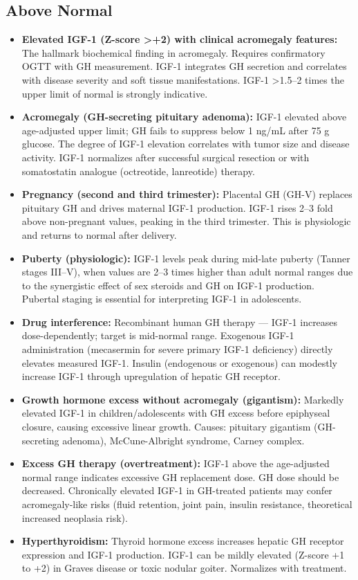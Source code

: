 \subsection*{Above Normal}
\begin{itemize}
  \item \textbf{Elevated IGF-1 (Z-score >+2) with clinical acromegaly features:} The hallmark biochemical finding in acromegaly. Requires confirmatory OGTT with GH measurement. IGF-1 integrates GH secretion and correlates with disease severity and soft tissue manifestations. IGF-1 >1.5--2 times the upper limit of normal is strongly indicative.
  \item \textbf{Acromegaly (GH-secreting pituitary adenoma):} IGF-1 elevated above age-adjusted upper limit; GH fails to suppress below 1 ng/mL after 75 g glucose. The degree of IGF-1 elevation correlates with tumor size and disease activity. IGF-1 normalizes after successful surgical resection or with somatostatin analogue (octreotide, lanreotide) therapy.
  \item \textbf{Pregnancy (second and third trimester):} Placental GH (GH-V) replaces pituitary GH and drives maternal IGF-1 production. IGF-1 rises 2--3 fold above non-pregnant values, peaking in the third trimester. This is physiologic and returns to normal after delivery.
  \item \textbf{Puberty (physiologic):} IGF-1 levels peak during mid-late puberty (Tanner stages III--V), when values are 2--3 times higher than adult normal ranges due to the synergistic effect of sex steroids and GH on IGF-1 production. Pubertal staging is essential for interpreting IGF-1 in adolescents.
  \item \textbf{Drug interference:} Recombinant human GH therapy --- IGF-1 increases dose-dependently; target is mid-normal range. Exogenous IGF-1 administration (mecasermin for severe primary IGF-1 deficiency) directly elevates measured IGF-1. Insulin (endogenous or exogenous) can modestly increase IGF-1 through upregulation of hepatic GH receptor.
  \item \textbf{Growth hormone excess without acromegaly (gigantism):} Markedly elevated IGF-1 in children/adolescents with GH excess before epiphyseal closure, causing excessive linear growth. Causes: pituitary gigantism (GH-secreting adenoma), McCune-Albright syndrome, Carney complex.
  \item \textbf{Excess GH therapy (overtreatment):} IGF-1 above the age-adjusted normal range indicates excessive GH replacement dose. GH dose should be decreased. Chronically elevated IGF-1 in GH-treated patients may confer acromegaly-like risks (fluid retention, joint pain, insulin resistance, theoretical increased neoplasia risk).
  \item \textbf{Hyperthyroidism:} Thyroid hormone excess increases hepatic GH receptor expression and IGF-1 production. IGF-1 can be mildly elevated (Z-score +1 to +2) in Graves disease or toxic nodular goiter. Normalizes with treatment.
\end{itemize}

